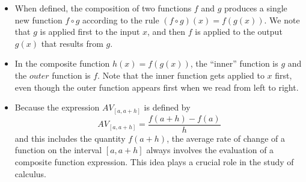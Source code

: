 \documentclass{ximera}
\begin{document}

\begin{summary}\begin{itemize}
\item When defined, the composition of two functions $f$ and $g$ produces a single new function $f \circ g$ according to the rule $(f \circ g)(x) = f(g(x))$.  We note that $g$ is applied first to the input $x$, and then $f$ is applied to the output $g(x)$ that results from $g$.
\item In the composite function $h(x) = f(g(x))$, the ``inner'' function is $g$ and the $outer$ function is $f$.  Note that the inner function gets applied to $x$ first, even though the outer function appears first when we read from left to right. 
\item Because the expression $AV_{[a,a+h]}$ is defined by%
\begin{equation*}
AV_{[a,a+h]} = \frac{f(a+h) - f(a)}{h} 
\end{equation*}
and this includes the quantity $f(a+h)$, the average rate of change of a function on the interval $[a,a+h]$ always involves the evaluation of a composite function expression.  This idea plays a crucial role in the study of calculus.
\end{itemize}\end{summary}
\end{document}

